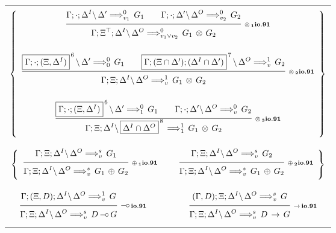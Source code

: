 \clearpage
\begin{figure}[t]
  \begin{center}
    \leavevmode

    \begin{tabular}{|c|}
      \hline \\
      $\left\{
        \begin{array}{c}
          \ruleII
            {\ioIXb{\G;\cdot;\D^I}{\D'}{G_1}{v_1}{0}}
            {\ioIXb{\G;\cdot;\D'}{\D^O}{G_2}{v_2}{0}}
            {\ioIXb{\G;\X^\top;\D^I}{\D^O}{G_1 \Times G_2}{v_1 \vee v_2}{0}}
            {\Times_1 io.91}
        \\ \\
          \ruleII
            {\ioIXb{\fb{\G;\cdot;(\X,\D^I)}{6}}{\D'}{G_1}{0}{0}}
            {\ioIXb{\fb{\G;(\X \cap \D');(\D^I \cap \D')}{7}}{\D^O}{G_2}{v}{1}}
            {\ioIXb{\G;\X;\D^I}{\D^O}{G_1 \Times G_2}{v}{1}}
            {\Times_2 io.91}
        \\ \\
          \ruleII
            {\ioIXb{\fb{\G;\cdot;(\X,\D^I)}{6}}{\D'}{G_1}{1}{0}}
            {\ioIXb{\G;\cdot;\D'}{\D^O}{G_2}{v}{0}}
            {\ioIXb{\G;\X;\D^I}{\fb{\D^I \cap \D^O}{8}}{G_1 \Times G_2}{1}{1}}
            {\Times_3 io.91}
        \end{array}
      \right\}$

      \\ \\ \\
      $\left\{
        \begin{array}{ccc}
          \ruleI
            {\ioIXb{\G;\X;\D^I}{\D^O}{G_1}{v}{s}}
            {\ioIXb{\G;\X;\D^I}{\D^O}{G_1 \Plus G_2}{v}{s}}
            {\Plus_1 io.91}
        &
          \hspace{0.5em}
        &
          \ruleI
            {\ioIXb{\G;\X;\D^I}{\D^O}{G_2}{v}{s}}
            {\ioIXb{\G;\X;\D^I}{\D^O}{G_1 \Plus G_2}{v}{s}}
            {\Plus_2 io.91}
        \end{array}
      \right\}$

      \\ \\ \\
      $\begin{array}{ccc}
        \ruleI
          {\ioIXb{\G;(\X,D);\D^I}{\D^O}{G}{v}{1}}
          {\ioIXb{\G;\X;\D^I}{\D^O}{D \Lolli G}{v}{s}}
          {\Lolli io.91}
      &
        \hspace{3em}
      &
        \ruleI
          {\ioIXb{(\G,D);\X;\D^I}{\D^O}{G}{v}{s}}
          {\ioIXb{\G;\X;\D^I}{\D^O}{D \Imp G}{v}{s}}
          {\Imp io.91}
      \end{array}$


\end{tabular}
\end{center}
\end{figure}
